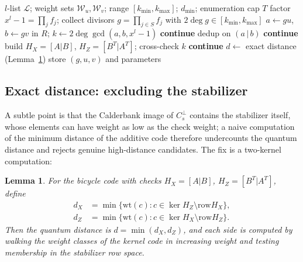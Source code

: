 \documentclass[journal,onecolumn]{IEEEtran}
\newtheorem{lemma}[theorem]{Lemma}
\theoremstyle{definition}
\theoremstyle{remark}
\newcommand{\wt}{\mathrm{wt}}
\newcommand{\row}{\mathrm{row}}
\newcommand{\invol}[1]{\bar{#1}}
\begin{document}
\begin{algorithm*}[t]
\caption{Divisor-driven search for bicycle codes}\label{alg:search}
\begin{algorithmic}[1]
\Require $l$-list $\mathcal L$; weight sets $\mathcal W_u,\mathcal W_v$;
range $[k_{\min},k_{\max}]$; $d_{\min}$; enumeration cap $T$
  \State factor $x^{l}-1=\prod_j f_j$; collect divisors $g=\prod_{j\in S}f_j$
  with $2\deg g\in[k_{\min},k_{\max}]$
      \State $a\gets gu$, $b\gets gv$ in $R$;\quad
      $k\gets 2\deg\gcd(a,b,x^l-1)$
       \textbf{continue}\EndIf
      \State dedup on $(a\,|\,b)$
      \If{$a\invol b+b\invol a\not\equiv0$} \textbf{continue}\EndIf
      \State build $H_X=[A|B]$, $H_Z=[B^{T}|A^{T}]$; cross-check $k$
       \textbf{continue}\EndIf
      \State $d\gets$ exact distance (Lemma~\ref{lem:exactd})
       store $(g,u,v)$ and parameters\EndIf
    \EndFor
  \EndFor
\EndFor
\end{algorithmic}
\end{algorithm*}


\subsection{Exact distance: excluding the stabilizer}
A subtle point is that the Calderbank image of $C_s^{\perp}$ contains the
stabilizer itself, whose elements can have weight as low as the check
weight; a naive computation of the minimum distance of the additive code
therefore undercounts the quantum distance and rejects genuine
high-distance candidates. The fix is a two-kernel computation:

\begin{lemma}\label{lem:exactd}
For the bicycle code with checks $H_X=[A|B]$, $H_Z=[B^T|A^T]$, define
\[
\begin{aligned}
d_X&=\min\bigl\{\wt(c):c\in\ker H_Z\setminus\row H_X\bigr\},\\
d_Z&=\min\bigl\{\wt(c):c\in\ker H_X\setminus\row H_Z\bigr\}.
\end{aligned}
\]
Then the quantum distance is $d=\min(d_X,d_Z)$, and each side is computed by
walking the weight classes of the kernel code in increasing weight and
testing membership in the stabilizer row space.
\end{lemma}
\end{document}
